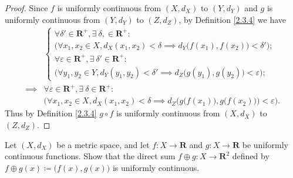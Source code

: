 \begin{proof}
    Since \(f\) is uniformly continuous from \((X, d_X)\) to \((Y, d_Y)\) and \(g\) is uniformly continuous from \((Y, d_Y)\) to \((Z, d_Z)\), by Definition \ref{2.3.4} we have
    \begin{align*}
                 & \begin{cases}
                       \forall \delta' \in \mathbf{R}^+, \exists\ \delta, \in \mathbf{R}^+ :                                    \\
                       \Big(\forall x_1, x_2 \in X, d_X(x_1, x_2) < \delta \implies d_Y\big(f(x_1), f(x_2)\big) < \delta'\Big); \\
                       \forall \varepsilon \in \mathbf{R}^+, \exists\ \delta' \in \mathbf{R}^+ :                                \\
                       \Big(\forall y_1, y_2 \in Y, d_Y(y_1, y_2) < \delta' \implies d_Z\big(g(y_1), g(y_2)\big) < \varepsilon\Big);
                   \end{cases}                         \\
        \implies & \forall \varepsilon \in \mathbf{R}^+, \exists\ \delta \in \mathbf{R}^+ :                                                             \\
                 & \bigg(\forall x_1, x_2 \in X, d_X(x_1, x_2) < \delta \implies d_Z\Big(g\big(f(x_1)\big), g\big(f(x_2)\big)\Big) < \varepsilon\bigg).
    \end{align*}
    Thus by Definition \ref{2.3.4} \(g \circ f\) is uniformly continuous from \((X, d_X)\) to \((Z, d_Z)\).
\end{proof}

\begin{exercise}\label{ex 2.3.5}
    Let \((X, d_X)\) be a metric space, and let \(f : X \to \mathbf{R}\) and \(g : X \to \mathbf{R}\) be uniformly continuous functions.
    Show that the direct sum \(f \oplus g : X \to \mathbf{R}^2\) defined by \(f \oplus g(x) \coloneqq \big(f(x), g(x)\big)\) is uniformly continuous.
\end{exercise}

